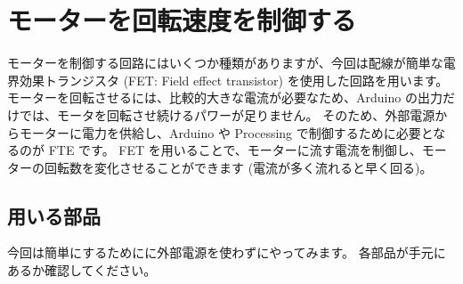\documentclass[11pt,a4paper]{jarticle}
\begin{document}
\section{モーターを回転速度を制御する}
モーターを制御する回路にはいくつか種類がありますが、今回は配線が簡単な電界効果トランジスタ (FET: Field effect transistor) を使用した回路を用います。
モーターを回転させるには、比較的大きな電流が必要なため、Arduino の出力だけでは、モータを回転させ続けるパワーが足りません。
そのため、外部電源からモーターに電力を供給し、Arduino や Processing で制御するために必要となるのが FTE です。
FET を用いることで、モーターに流す電流を制御し、モーターの回転数を変化させることができます (電流が多く流れると早く回る)。

\subsection*{用いる部品}
今回は簡単にするためにに外部電源を使わずにやってみます。
各部品が手元にあるか確認してください。
\end{document}
